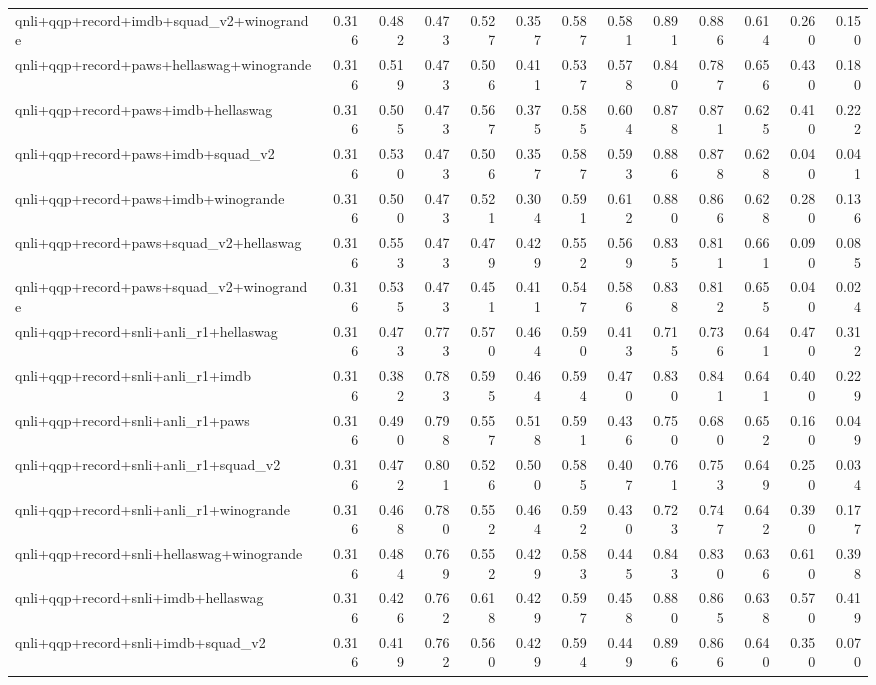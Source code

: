 \begin{table}[t]
\begin{tabular}{lrrrrrrrrrrrr}
    qnli+qqp+record+imdb+squad\_v2+winogrande & 0.316 & 0.482 & 0.473 & 0.527 & 0.357 & 0.587 & 0.581 & 0.891 & 0.886 & 0.614 & 0.260 & 0.150 \\
    qnli+qqp+record+paws+hellaswag+winogrande & 0.316 & 0.519 & 0.473 & 0.506 & 0.411 & 0.537 & 0.578 & 0.840 & 0.787 & 0.656 & 0.430 & 0.180 \\
    qnli+qqp+record+paws+imdb+hellaswag & 0.316 & 0.505 & 0.473 & 0.567 & 0.375 & 0.585 & 0.604 & 0.878 & 0.871 & 0.625 & 0.410 & 0.222 \\
    qnli+qqp+record+paws+imdb+squad\_v2 & 0.316 & 0.530 & 0.473 & 0.506 & 0.357 & 0.587 & 0.593 & 0.886 & 0.878 & 0.628 & 0.040 & 0.041 \\
    qnli+qqp+record+paws+imdb+winogrande & 0.316 & 0.500 & 0.473 & 0.521 & 0.304 & 0.591 & 0.612 & 0.880 & 0.866 & 0.628 & 0.280 & 0.136 \\
    qnli+qqp+record+paws+squad\_v2+hellaswag & 0.316 & 0.553 & 0.473 & 0.479 & 0.429 & 0.552 & 0.569 & 0.835 & 0.811 & 0.661 & 0.090 & 0.085 \\
    qnli+qqp+record+paws+squad\_v2+winogrande & 0.316 & 0.535 & 0.473 & 0.451 & 0.411 & 0.547 & 0.586 & 0.838 & 0.812 & 0.655 & 0.040 & 0.024 \\
    qnli+qqp+record+snli+anli\_r1+hellaswag & 0.316 & 0.473 & 0.773 & 0.570 & 0.464 & 0.590 & 0.413 & 0.715 & 0.736 & 0.641 & 0.470 & 0.312 \\
    qnli+qqp+record+snli+anli\_r1+imdb & 0.316 & 0.382 & 0.783 & 0.595 & 0.464 & 0.594 & 0.470 & 0.830 & 0.841 & 0.641 & 0.400 & 0.229 \\
    qnli+qqp+record+snli+anli\_r1+paws & 0.316 & 0.490 & 0.798 & 0.557 & 0.518 & 0.591 & 0.436 & 0.750 & 0.680 & 0.652 & 0.160 & 0.049 \\
    qnli+qqp+record+snli+anli\_r1+squad\_v2 & 0.316 & 0.472 & 0.801 & 0.526 & 0.500 & 0.585 & 0.407 & 0.761 & 0.753 & 0.649 & 0.250 & 0.034 \\
    qnli+qqp+record+snli+anli\_r1+winogrande & 0.316 & 0.468 & 0.780 & 0.552 & 0.464 & 0.592 & 0.430 & 0.723 & 0.747 & 0.642 & 0.390 & 0.177 \\
    qnli+qqp+record+snli+hellaswag+winogrande & 0.316 & 0.484 & 0.769 & 0.552 & 0.429 & 0.583 & 0.445 & 0.843 & 0.830 & 0.636 & 0.610 & 0.398 \\
    qnli+qqp+record+snli+imdb+hellaswag & 0.316 & 0.426 & 0.762 & 0.618 & 0.429 & 0.597 & 0.458 & 0.880 & 0.865 & 0.638 & 0.570 & 0.419 \\
    qnli+qqp+record+snli+imdb+squad\_v2 & 0.316 & 0.419 & 0.762 & 0.560 & 0.429 & 0.594 & 0.449 & 0.896 & 0.866 & 0.640 & 0.350 & 0.070 \\

\end{tabular}
\end{table}
